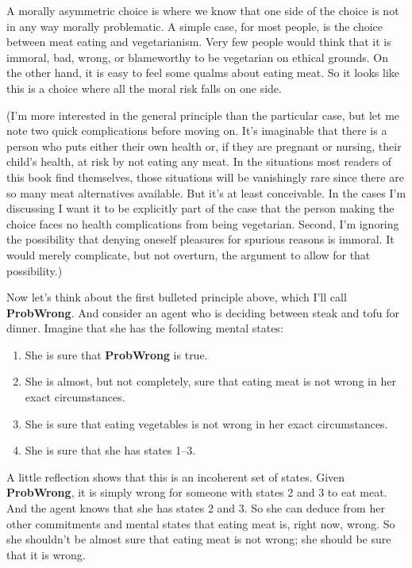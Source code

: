 \documentclass[
  10pt,
  letterpaper,
  twoside]{scrbook}
\providecommand{\tightlist}{%
  \setlength{\itemsep}{0pt}\setlength{\parskip}{0pt}}\usepackage{longtable,booktabs,array}
\begin{document}
A morally asymmetric choice is where we know that one side of the choice
is not in any way morally problematic. A simple case, for most people,
is the choice between meat eating and vegetarianism. Very few people
would think that it is immoral, bad, wrong, or blameworthy to be
vegetarian on ethical grounds. On the other hand, it is easy to feel
some qualms about eating meat. So it looks like this is a choice where
all the moral risk falls on one side.

(I'm more interested in the general principle than the particular case,
but let me note two quick complications before moving on. It's
imaginable that there is a person who puts either their own health or,
if they are pregnant or nursing, their child's health, at risk by not
eating any meat. In the situations most readers of this book find
themselves, those situations will be vanishingly rare since there are so
many meat alternatives available. But it's at least conceivable. In the
cases I'm discussing I want it to be explicitly part of the case that
the person making the choice faces no health complications from being
vegetarian. Second, I'm ignoring the possibility that denying oneself
pleasures for spurious reasons is immoral. It would merely complicate,
but not overturn, the argument to allow for that possibility.)

Now let's think about the first bulleted principle above, which I'll
call \textbf{ProbWrong}. And consider an agent who is deciding between
steak and tofu for dinner. Imagine that she has the following mental
states:

\begin{enumerate}
\def\labelenumi{\arabic{enumi}.}
\tightlist
\item
  She is sure that \textbf{ProbWrong} is true.
\item
  She is almost, but not completely, sure that eating meat is not wrong
  in her exact circumstances.
\item
  She is sure that eating vegetables is not wrong in her exact
  circumstances.
\item
  She is sure that she has states 1--3.
\end{enumerate}

A little reflection shows that this is an incoherent set of states.
Given \textbf{ProbWrong}, it is simply wrong for someone with states 2
and 3 to eat meat. And the agent knows that she has states 2 and 3. So
she can deduce from her other commitments and mental states that eating
meat is, right now, wrong. So she shouldn't be almost sure that eating
meat is not wrong; she should be sure that it is wrong.
\end{document}
